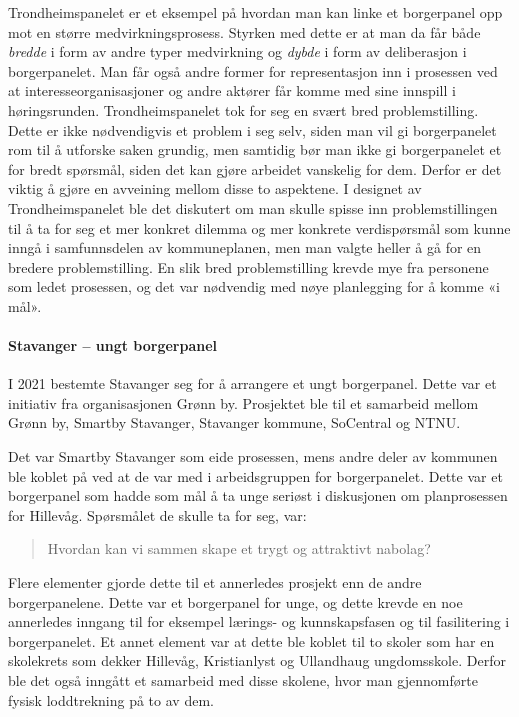 \documentclass[
  12pt,
  a4paper, 12pt]{article}
\begin{document}
Trondheimspanelet er et eksempel på hvordan man kan linke et borgerpanel opp mot en større medvirkningsprosess. Styrken med dette er at man da får både \emph{bredde} i form av andre typer medvirkning og \emph{dybde} i form av deliberasjon i borgerpanelet. Man får også andre former for representasjon inn i prosessen ved at interesseorganisasjoner og andre aktører får komme med sine innspill i høringsrunden.
Trondheimspanelet tok for seg en svært bred problemstilling. Dette er ikke nødvendigvis et problem i seg selv, siden man vil gi borgerpanelet rom til å utforske saken grundig, men samtidig bør man ikke gi borgerpanelet et for bredt spørsmål, siden det kan gjøre arbeidet vanskelig for dem. Derfor er det viktig å gjøre en avveining mellom disse to aspektene. I designet av Trondheimspanelet ble det diskutert om man skulle spisse inn problemstillingen til å ta for seg et mer konkret dilemma og mer konkrete verdispørsmål som kunne inngå i samfunnsdelen av kommuneplanen, men man valgte heller å gå for en bredere problemstilling. En slik bred problemstilling krevde mye fra personene som ledet prosessen, og det var nødvendig med nøye planlegging for å komme «i mål».

\hypertarget{stavanger-ungt-borgerpanel}{%
\paragraph{Stavanger -- ungt borgerpanel}\label{stavanger-ungt-borgerpanel}}

I 2021 bestemte Stavanger seg for å arrangere et ungt borgerpanel. Dette var et initiativ fra organisasjonen Grønn by. Prosjektet ble til et samarbeid mellom Grønn by, Smartby Stavanger, Stavanger kommune, SoCentral og NTNU.

Det var Smartby Stavanger som eide prosessen, mens andre deler av kommunen ble koblet på ved at de var med i arbeidsgruppen for borgerpanelet. Dette var et borgerpanel som hadde som mål å ta unge seriøst i diskusjonen om planprosessen for Hillevåg. Spørsmålet de skulle ta for seg, var:

\begin{quote}
Hvordan kan vi sammen skape et trygt og attraktivt nabolag?
\end{quote}

Flere elementer gjorde dette til et annerledes prosjekt enn de andre borgerpanelene. Dette var et borgerpanel for unge, og dette krevde en noe annerledes inngang til for eksempel lærings- og kunnskapsfasen og til fasilitering i borgerpanelet. Et annet element var at dette ble koblet til to skoler som har en skolekrets som dekker Hillevåg, Kristianlyst og Ullandhaug ungdomsskole. Derfor ble det også inngått et samarbeid med disse skolene, hvor man gjennomførte fysisk loddtrekning på to av dem.
\end{document}
